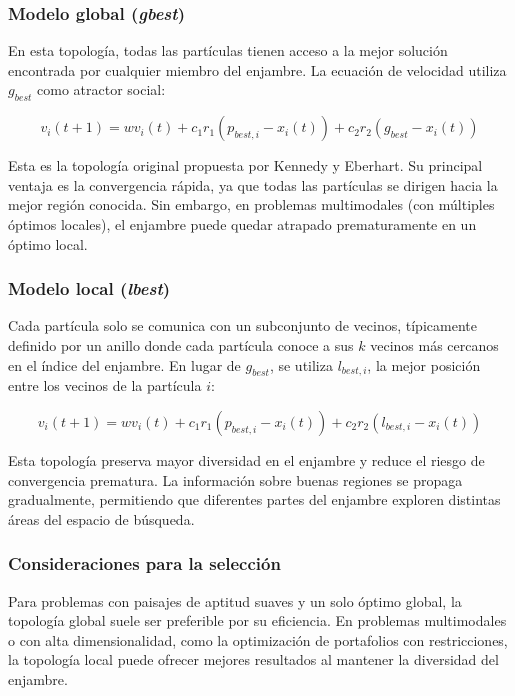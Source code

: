 \documentclass[12pt]{article}
\begin{document}
\subsubsection{Modelo global (\textit{gbest})}

En esta topología, todas las partículas tienen acceso a la mejor
solución encontrada por cualquier miembro del enjambre. La ecuación
de velocidad utiliza $g_{best}$ como atractor social:

\begin{equation}
  v_i(t+1) = w v_i(t) + c_1 r_1 (p_{best,i} - x_i(t)) + c_2 r_2
  (g_{best} - x_i(t))
\end{equation}

Esta es la topología original propuesta por Kennedy y Eberhart.
Su principal ventaja es la convergencia rápida, ya que todas las
partículas se dirigen hacia la mejor región conocida. Sin embargo,
en problemas multimodales (con múltiples óptimos locales), el
enjambre puede quedar atrapado prematuramente en un óptimo local.

\subsubsection{Modelo local (\textit{lbest})}

Cada partícula solo se comunica con un subconjunto de vecinos,
típicamente definido por un anillo donde cada partícula conoce a sus
$k$ vecinos más cercanos en el índice del enjambre. En lugar de
$g_{best}$, se utiliza $l_{best,i}$, la mejor posición entre los
vecinos de la partícula $i$:

\begin{equation}
  v_i(t+1) = w v_i(t) + c_1 r_1 (p_{best,i} - x_i(t)) + c_2 r_2
  (l_{best,i} - x_i(t))
\end{equation}

Esta topología preserva mayor diversidad en el enjambre y reduce el
riesgo de convergencia prematura. La información sobre buenas
regiones se propaga gradualmente, permitiendo que diferentes partes
del enjambre exploren distintas áreas del espacio de búsqueda.

\subsubsection{Consideraciones para la selección}

Para problemas con paisajes de aptitud suaves y un solo óptimo
global, la topología global suele ser preferible por su eficiencia.
En problemas multimodales o con alta dimensionalidad, como la
optimización de portafolios con restricciones, la topología local
puede ofrecer mejores resultados al mantener la diversidad del
enjambre.
\end{document}

